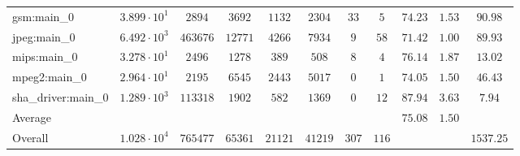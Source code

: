 \begin{tabular}{|l|c|c|c|c|c|c|c|c|c|c|}
gsm:main\_0             & $ 3.899 \cdot 10^{1} $ & $ 2894   $ & $ 3692  $ & $ 1132  $ & $ 2304  $ & $ 33  $ & $ 5   $ & $ 74.23       $ & $ 1.53    $ & $ 90.98   $ \\
jpeg:main\_0            & $ 6.492 \cdot 10^{3} $ & $ 463676 $ & $ 12771 $ & $ 4266  $ & $ 7934  $ & $ 9   $ & $ 58  $ & $ 71.42       $ & $ 1.00    $ & $ 89.93   $ \\
mips:main\_0            & $ 3.278 \cdot 10^{1} $ & $ 2496   $ & $ 1278  $ & $ 389   $ & $ 508   $ & $ 8   $ & $ 4   $ & $ 76.14       $ & $ 1.87    $ & $ 13.02   $ \\
mpeg2:main\_0           & $ 2.964 \cdot 10^{1} $ & $ 2195   $ & $ 6545  $ & $ 2443  $ & $ 5017  $ & $ 0   $ & $ 1   $ & $ 74.05       $ & $ 1.50    $ & $ 46.43   $ \\
sha\_driver:main\_0     & $ 1.289 \cdot 10^{3} $ & $ 113318 $ & $ 1902  $ & $ 582   $ & $ 1369  $ & $ 0   $ & $ 12  $ & $ 87.94       $ & $ 3.63    $ & $ 7.94    $ \\
\hline
Average                 & $                    $ & $        $ & $       $ & $       $ & $       $ & $     $ & $     $ & $ 75.08       $ & $ 1.50    $ & $         $ \\
\hline
Overall                 & $ 1.028 \cdot 10^{4} $ & $ 765477 $ & $ 65361 $ & $ 21121 $ & $ 41219 $ & $ 307 $ & $ 116 $ & $             $ & $         $ & $ 1537.25 $ \\
\hline
\end{tabular}
